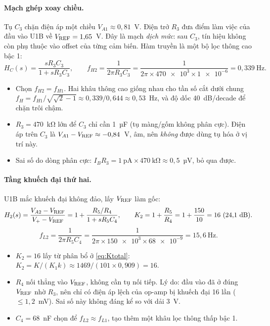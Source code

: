 \paragraph{Mạch ghép xoay chiều.} Tụ $C_3$ chặn điện áp một chiều $V_{A1} \approx 0{,}81$~V. Điện trở $R_3$ đưa điểm làm việc của đầu vào U1B về $V_\mathrm{REF} = 1{,}65$~V. Đây là mạch \emph{dịch mức}: sau $C_3$, tín hiệu không còn phụ thuộc vào offset của từng cảm biến. Hàm truyền là một bộ lọc thông cao bậc 1:
\begin{equation}
  H_C(s) = \frac{sR_3C_3}{1+sR_3C_3},\qquad
  f_{H2} = \frac{1}{2\pi R_3C_3} = \frac{1}{2\pi\times\num{470e3}\times\num{1e-6}} = 0{,}339~\text{Hz}.
  \label{eq:HC}
\end{equation}
\begin{itemize}
  \item Chọn $f_{H2} = f_{H1}$. Hai khâu thông cao giống nhau cho tần số cắt dưới chung $f_H = f_{H1}/\sqrt{\sqrt2 - 1} \approx 0{,}339/0{,}644 \approx 0{,}53$~Hz, và độ dốc 40~dB/decade để chặn trôi chậm.
  \item $R_3 = 470$~kΩ lớn để $C_3$ chỉ cần 1~µF (tụ màng/gốm không phân cực). Điện áp trên $C_3$ là $V_{A1} - V_\mathrm{REF} \approx -0{,}84$~V, âm, nên \emph{không} được dùng tụ hóa ở vị trí này.
  \item Sai số do dòng phân cực: $I_B R_3 = 1~\text{pA}\times470~\text{kΩ} \approx 0{,}5$~µV, bỏ qua được.
\end{itemize}

\paragraph{Tầng khuếch đại thứ hai.} U1B mắc khuếch đại không đảo, lấy $V_\mathrm{REF}$ làm gốc:
\begin{equation}
  H_2(s) = \frac{V_{A2}-V_\mathrm{REF}}{V_{+}-V_\mathrm{REF}} = 1 + \frac{R_5/R_4}{1+sR_5C_4},\qquad
  K_2 = 1+\frac{R_5}{R_4} = 1+\frac{150}{10} = 16~(24{,}1~\text{dB}).
  \label{eq:H2}
\end{equation}
\begin{equation}
  f_{L2} = \frac{1}{2\pi R_5C_4} = \frac{1}{2\pi\times\num{150e3}\times\num{68e-9}} = 15{,}6~\text{Hz}.
\end{equation}
\begin{itemize}
  \item $K_2 = 16$ lấy từ phân bổ ở \eqref{eq:Ktotal}: $K_2 = K/(K_1 k) \approx 1469/(101\times0{,}909) = 16$.
  \item $R_4$ nối thẳng vào $V_\mathrm{REF}$, không cần tụ nối tiếp. Lý do: đầu vào đã ở đúng $V_\mathrm{REF}$ nhờ $R_3$, nên chỉ có điện áp lệch của op-amp bị khuếch đại 16 lần ($\le 1{,}2$~mV). Sai số này không đáng kể so với dải 3~V.
  \item $C_4 = 68$~nF chọn để $f_{L2} \approx f_{L1}$, tạo thêm một khâu lọc thông thấp bậc 1.
\end{itemize}

